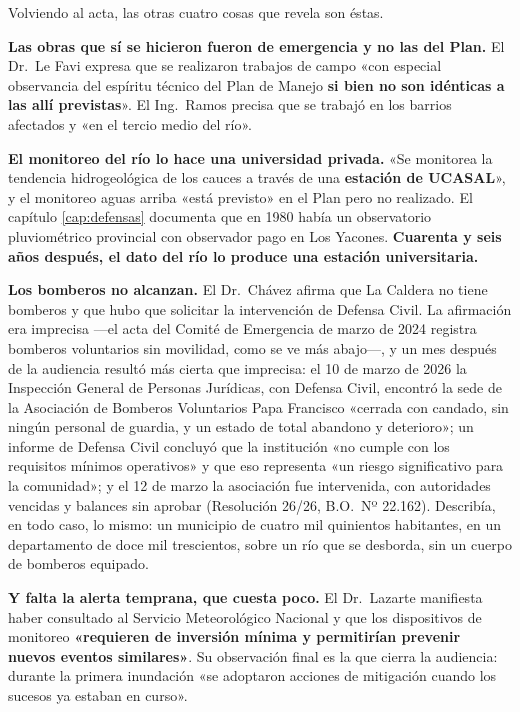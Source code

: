  Volviendo al acta, las otras cuatro cosas que revela son éstas.

\textbf{Las obras que sí se hicieron fueron de emergencia y no las del Plan.} El Dr.\ Le Favi
expresa que se realizaron trabajos de campo «con especial observancia del espíritu técnico del
Plan de Manejo \textbf{si bien no son idénticas a las allí previstas}». El Ing.\ Ramos precisa
que se trabajó en los barrios afectados y «en el tercio medio del río».

\textbf{El monitoreo del río lo hace una universidad privada.} «Se monitorea la tendencia
hidrogeológica de los cauces a través de una \textbf{estación de UCASAL}», y el monitoreo
aguas arriba «está previsto» en el Plan pero no realizado. El capítulo \ref{cap:defensas} documenta que en
1980 había un observatorio pluviométrico provincial con observador pago en Los Yacones.
\textbf{Cuarenta y seis años después, el dato del río lo produce una estación universitaria.}

\textbf{Los bomberos no alcanzan.} El Dr.\ Chávez afirma que La Caldera no tiene bomberos y que hubo que solicitar
la intervención de Defensa Civil. La afirmación era imprecisa ---el acta del Comité de Emergencia de marzo de 2024 registra bomberos voluntarios sin movilidad, como se ve más abajo---, y un mes después de la audiencia resultó más cierta que imprecisa: el 10 de marzo de 2026 la Inspección General de Personas Jurídicas, con Defensa Civil, encontró la sede de la Asociación de Bomberos Voluntarios Papa Francisco «cerrada con candado, sin ningún personal de guardia, y un estado de total abandono y deterioro»; un informe de Defensa Civil concluyó que la institución «no cumple con los requisitos mínimos operativos» y que eso representa «un riesgo significativo para la comunidad»; y el 12 de marzo la asociación fue intervenida, con autoridades vencidas y balances sin aprobar (Resolución 26/26, B.O.\ Nº 22.162). Describía, en todo caso, lo mismo: un municipio de cuatro mil quinientos habitantes, en un departamento de doce mil trescientos, sobre un
río que se desborda, sin un cuerpo de bomberos equipado.

\textbf{Y falta la alerta temprana, que cuesta poco.} El Dr.\ Lazarte manifiesta haber
consultado al Servicio Meteorológico Nacional y que los dispositivos de monitoreo
\textbf{«requieren de inversión mínima y permitirían prevenir nuevos eventos similares»}. Su
observación final es la que cierra la audiencia: durante la primera inundación «se adoptaron
acciones de mitigación cuando los sucesos ya estaban en curso».

